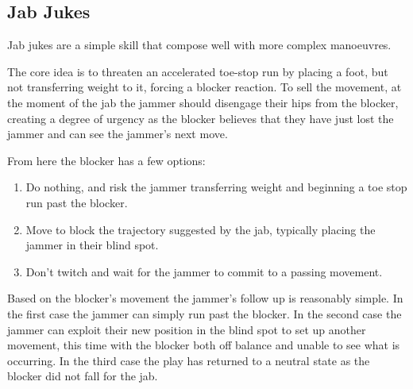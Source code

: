 \subsection*{Jab Jukes}
\label{skill:jab_jukes}

Jab jukes are a simple skill that compose well with more complex manoeuvres. 

The core idea is to threaten an accelerated toe-stop run by placing a foot, but not transferring weight to it, forcing a blocker reaction.  
To sell the movement, at the moment of the jab the jammer should disengage their hips from the blocker, creating a degree of urgency as the blocker believes that they have just lost the jammer and can see the jammer's next move.


From here the blocker has a few options:

\begin{enumerate}
\item Do nothing, and risk the jammer transferring weight and beginning a toe stop run past the blocker.  
\item Move to block the trajectory suggested by the jab, typically placing the jammer in their blind spot. 
\item Don't twitch and wait for the jammer to commit to a passing movement.
\end{enumerate}

Based on the blocker's movement the jammer's follow up is reasonably simple. 
In the first case the jammer can simply run past the blocker. 
In the second case the jammer can exploit their new position in the blind spot to set up another movement, this time with the blocker both off balance and unable to see what is occurring.
In the third case the play has returned to a neutral state as the blocker did not fall for the jab.
